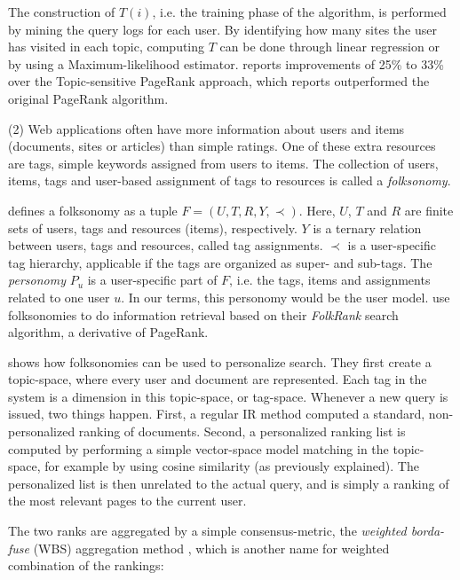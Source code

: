 The construction of $T(i)$, i.e. the training phase of the algorithm, is performed by mining the query logs for each user.
By identifying how many sites the user has visited in each topic, computing $T$ can be done through linear regression or
by using a Maximum-likelihood estimator.
\citet[p10]{Qiu2006} reports improvements of 25\% to 33\% over the Topic-sensitive PageRank approach, which 
\citet{Haveliwala2003} reports outperformed the original PageRank algorithm.


(2) Web applications often have more information about users and items (documents, sites or articles) 
than simple ratings. One of these extra resources are tags, simple keywords assigned from users to items. 
The collection of users, items, tags and user-based assignment of tags to resources is called a \emph{folksonomy}.

\cite{Hotho} defines a folksonomy as a tuple $F = (U,T,R,Y,\prec)$. 
Here, $U$, $T$ and $R$ are finite sets of users, tags and resources (items), respectively. 
$Y$ is a ternary relation between users, tags and resources, called tag assignments. 
$\prec$ is a user-specific tag hierarchy, applicable if the tags are organized as super- and sub-tags. 
The \emph{personomy} $P_u$ is a user-specific part of $F$, 
i.e. the tags, items and assignments related to one user $u$. 
In our terms, this personomy would be the user model. 
\citeauthor{Hotho} use folksonomies to do information retrieval based on their 
\emph{FolkRank} search algorithm, a derivative of PageRank. 

\cite{Bao2007} shows how folksonomies can be used to personalize search.
They first create a topic-space, where every user and document are represented.
Each tag in the system is a dimension in this topic-space, or tag-space.
Whenever a new query is issued, two things happen. First, a regular IR method
computed a standard, non-personalized ranking of documents.
Second, a personalized ranking list is computed by performing a simple
vector-space model matching in the topic-space, for example by using
cosine similarity (as previously explained). The personalized list
is then unrelated to the actual query, and is simply a ranking of the
most relevant pages to the current user.

The two ranks are aggregated by a simple consensus-metric, the
\emph{weighted borda-fuse} (WBS) aggregation method \cite[p3]{Xu2008}, 
which is another name for weighted combination of the rankings:


